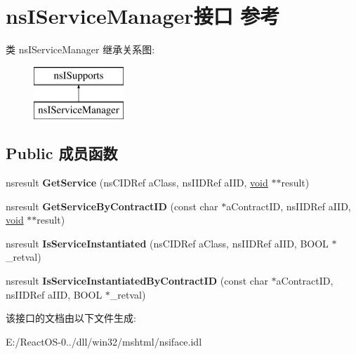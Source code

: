 \hypertarget{interfacens_i_service_manager}{}\section{ns\+I\+Service\+Manager接口 参考}
\label{interfacens_i_service_manager}
类 ns\+I\+Service\+Manager 继承关系图\+:\begin{figure}[H]
\begin{center}
\leavevmode
\includegraphics[height=2.000000cm]{interfacens_i_service_manager}
\end{center}
\end{figure}
\subsection*{Public 成员函数}
\begin{DoxyCompactItemize}
\item 
\mbox{\label{interfacens_i_service_manager_ad99514547e1eac54f0774c8ae825d584}} 
nsresult {\bfseries Get\+Service} (ns\+C\+I\+D\+Ref a\+Class, ns\+I\+I\+D\+Ref a\+I\+ID, \hyperlink{interfacevoid}{void} $\ast$$\ast$result)
\item 
\mbox{\label{interfacens_i_service_manager_a88cd0ff2695ba4f112c011a39518cedc}} 
nsresult {\bfseries Get\+Service\+By\+Contract\+ID} (const char $\ast$a\+Contract\+ID, ns\+I\+I\+D\+Ref a\+I\+ID, \hyperlink{interfacevoid}{void} $\ast$$\ast$result)
\item 
\mbox{\label{interfacens_i_service_manager_a36d48782425ed1f5de3fc255e882b6e1}} 
nsresult {\bfseries Is\+Service\+Instantiated} (ns\+C\+I\+D\+Ref a\+Class, ns\+I\+I\+D\+Ref a\+I\+ID, B\+O\+OL $\ast$\+\_\+retval)
\item 
\mbox{\label{interfacens_i_service_manager_a113fbd97539f2b3b95d697fee7ded592}} 
nsresult {\bfseries Is\+Service\+Instantiated\+By\+Contract\+ID} (const char $\ast$a\+Contract\+ID, ns\+I\+I\+D\+Ref a\+I\+ID, B\+O\+OL $\ast$\+\_\+retval)
\end{DoxyCompactItemize}


该接口的文档由以下文件生成\+:\begin{DoxyCompactItemize}
\item 
E\+:/\+React\+O\+S-\/0../dll/win32/mshtml/nsiface.\+idl\end{DoxyCompactItemize}
